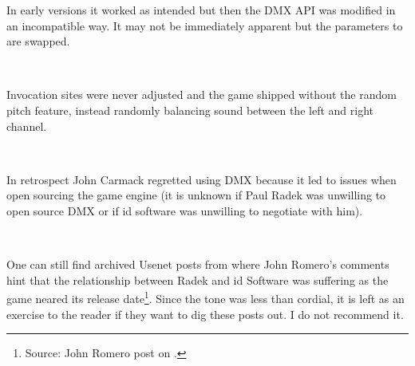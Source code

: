 In early versions it worked as intended but then the DMX API was modified in an incompatible way. It may not be immediately apparent but the parameters to  are swapped.\\
\par
{}\\
\par
 Invocation sites were never adjusted and the game shipped without the random pitch feature, instead randomly balancing sound between the left and right channel.\\
\par
{}\\
\par
In retrospect John Carmack regretted using DMX because it led to issues when open sourcing the game engine (it is unknown if Paul Radek was unwilling to open source DMX or if id software was unwilling to negotiate with him).\\
\par
{}\\
\par
One can still find archived Usenet posts from  where John Romero's comments hint that the relationship between Radek and id Software was suffering as the game neared its release date\footnote{Source: John Romero post on .}. Since the tone was less than cordial, it is left as an exercise to the reader if they want to dig these posts out. I do not recommend it.



